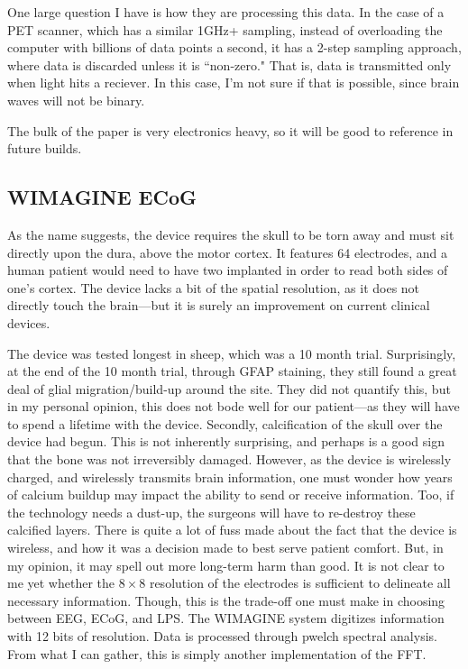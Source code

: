 \documentclass[12pt]{report}
\begin{document}
One large question I have is how they are processing this data. In the case of a PET scanner, which has a similar 1GHz+ sampling, instead of overloading the computer with billions of data points a second, it has a 2-step sampling approach, where data is discarded unless it is ``non-zero." That is, data is transmitted only when light hits a reciever. In this case, I'm not sure if that is possible, since brain waves will not be binary.\newline

The bulk of the paper is very electronics heavy, so it will be good to reference in future builds. 





\subsection{WIMAGINE ECoG}
As the name suggests, the device requires the skull to be torn away and must sit directly upon the dura, above the motor cortex. It features 64 electrodes, and a human patient would need to have two implanted in order to read both sides of one's cortex. The device lacks a bit of the spatial resolution, as it does not directly touch the brain---but it is surely an improvement on current clinical devices.\newline

The device was tested longest in sheep, which was a 10 month trial. Surprisingly, at the end of the 10 month trial, through GFAP staining, they still found a great deal of glial migration/build-up around the site. They did not quantify this, but in my personal opinion, this does not bode well for our patient---as they will have to spend a lifetime with the device. Secondly, calcification of the skull over the device had begun. This is not inherently surprising, and perhaps is a good sign that the bone was not irreversibly damaged. However, as the device is wirelessly charged, and wirelessly transmits brain information, one must wonder how years of calcium buildup may impact the ability to send or receive information. Too, if the technology needs a dust-up, the surgeons will have to re-destroy these calcified layers. There is quite a lot of fuss made about the fact that the device is wireless, and how it was a decision made to best serve patient comfort. But, in my opinion, it may spell out more long-term harm than good. It is not clear to me yet whether the $8\times 8$ resolution of the electrodes is sufficient to delineate all necessary information. Though, this is the trade-off one must make in choosing between EEG, ECoG, and LPS. The WIMAGINE system digitizes information with 12 bits of resolution. Data is processed through pwelch spectral analysis. From what I can gather, this is simply another implementation of the FFT. 
\end{document}
